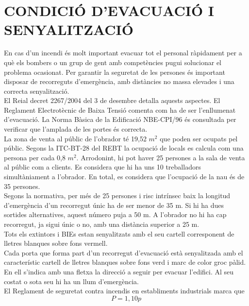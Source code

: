\section{\uppercase{Condició d'evacuació i senyalització}}
En cas d'un incendi és molt important evacuar tot el personal ràpidament per a què els bombers o un grup de gent amb competències pugui solucionar el problema ocasionat. Per garantir la seguretat de les persones és important disposar de recorreguts d'emergència, amb distàncies no massa elevades i una correcta senyalització.\\
\newline El Reial decret 2267/2004 del 3 de desembre detalla aquests aspectes. El Reglament Electrotècnic de Baixa Tensió comenta com ha de ser l'enllumenat d'evacuació. La Norma Bàsica de la Edificació NBE-CPI/96 és consultada per verificar que l'amplada de les portes és correcta.\\
\newline La zona de venta al públic de l'obrador té 19,52 $m^2$ que poden ser ocupats pel públic. Segons la ITC-BT-28 del REBT la ocupació de locals es calcula com una persona per cada 0,8 $m^2$. Arrodonint, hi pot haver 25 persones a la sala de venta al públic com a clients. Es considera que hi ha uns 10 treballadors simultàniament a l'obrador. En total, es considera que l'ocupació de la nau és de 35 persones.\\
\newline Segons la normativa, per més de 25 persones i risc intrínsec baix la longitud d'emergència d'un recorregut únic ha de ser menor de 35 m. Si hi ha dues sortides alternatives, aquest número puja a 50 m. A l'obrador no hi ha cap recorregut, ja sigui únic o no, amb una distància superior a 25 m.\\
\newline Tots els extintors i BIEs estan senyalitzats amb el seu cartell corresponent de lletres blanques sobre fons vermell.\\
\newline Cada porta que forma part d'un recorregut d'evacuació està senyalitzada amb el característic cartell de lletres blanques sobre fons verd i marc de color groc pàlid. En ell s'indica amb una fletxa la direcció a seguir per evacuar l'edifici. Al seu costat o sota seu hi ha un llum d'emergència. \\
\newline El Reglament de seguretat contra incendis en establiments industrials marca que 
\begin{equation}
P = 1,10 p
\end{equation}
